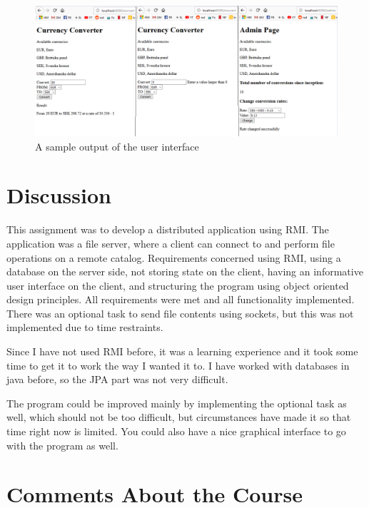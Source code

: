 \documentclass[a4paper]{scrartcl}
\begin{document}
\begin{figure}[h!]
    \begin{center}
        \includegraphics[scale=0.52]{ui.png}
        \caption{A sample output of the user interface}
        \label{fig:ui}
    \end{center}
\end{figure}



\section{Discussion}

This assignment was to develop a distributed application using RMI. The application was a file server, where a client can connect to and perform file operations on a remote catalog. Requirements concerned using RMI, using a database on the server side, not storing state on the client, having an informative user interface on the client, and structuring the program using object oriented design principles. All requirements were met and all functionality implemented. There was an optional task to send file contents using sockets, but this was not implemented due to time restraints.

Since I have not used RMI before, it was a learning experience and it took some time to get it to work the way I wanted it to. I have worked with databases in java before, so the JPA part was not very difficult.

The program could be improved mainly by implementing the optional task as well, which should not be too difficult, but circumstances have made it so that time right now is limited. You could also have a nice graphical interface to go with the program as well.


\section{Comments About the Course}
\end{document}
